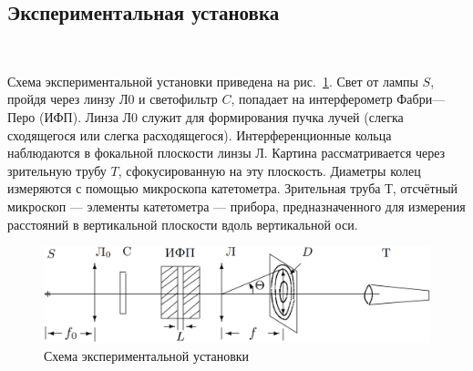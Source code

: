 \documentclass[12pt]{article}
\begin{document}
    \subsection*{Экспериментальная установка}
    \ \par
    Схема экспериментальной установки приведена на рис.\ \ref{fig:fig2}.
    Свет от лампы $S$, пройдя через линзу $\text{Л}0$ и светофильтр $C$, попадает на интерферометр Фабри—Перо (ИФП).
    Линза $\text{Л}0$ служит для формирования пучка лучей (слегка сходящегося или слегка расходящегося).
    Интерференционные кольца наблюдаются в фокальной плоскости линзы $Л$.
    Картина рассматривается через зрительную трубу $T$, сфокусированную на эту плоскость.
    Диаметры колец измеряются с помощью микроскопа катетометра.
    Зрительная труба $Т$, отсчётный микроскоп — элементы катетометра — прибора,
    предназначенного для измерения расстояний в вертикальной плоскости вдоль вертикальной оси.


    \begin{figure}[h]
        \centering
        \includegraphics[width=\linewidth]{pic/setup}
        \caption{Схема экспериментальной установки}
        \label{fig:fig2}
    \end{figure}
\end{document}
